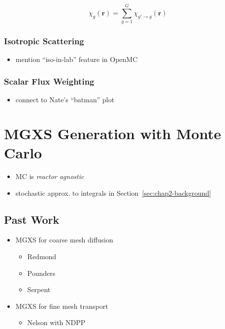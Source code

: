 \begin{equation}
\label{eqn:moc-theory-condensed-chi-group}
\chi_{g}(\mathbf{r}) = \displaystyle\sum\limits_{g=1}^{G}\chi_{g'\rightarrow g}(\mathbf{r})
\end{equation}


\subsubsection{Isotropic Scattering}
\label{subsubsec:chap2-iso-scatter}

\begin{itemize}
  \item mention ``iso-in-lab'' feature in OpenMC
\end{itemize}

\subsubsection{Scalar Flux Weighting}
\label{subsubsec:chap2-const-in-angle}

\begin{itemize}[noitemsep]
  \item connect to Nate's ``batman'' plot
\end{itemize}


\section{MGXS Generation with Monte Carlo}
\label{sec:chap2-mgxs-mc}

\begin{itemize}[noitemsep]
  \item \ac{MC} is \emph{reactor agnostic}
  \item stochastic approx. to integrals in Section~\ref{sec:chap2-background}
\end{itemize}

\subsection{Past Work}
\label{subsec:chap2-past-work}

\begin{itemize}[noitemsep]
  \item \ac{MGXS} for coarse mesh diffusion
  \begin{itemize}[noitemsep]
    \item Redmond
    \item Pounders
    \item Serpent
  \end{itemize}
  \item \ac{MGXS} for fine mesh transport
  \begin{itemize}[noitemsep]
    \item Nelson with NDPP
  \end{itemize}
\end{itemize}


